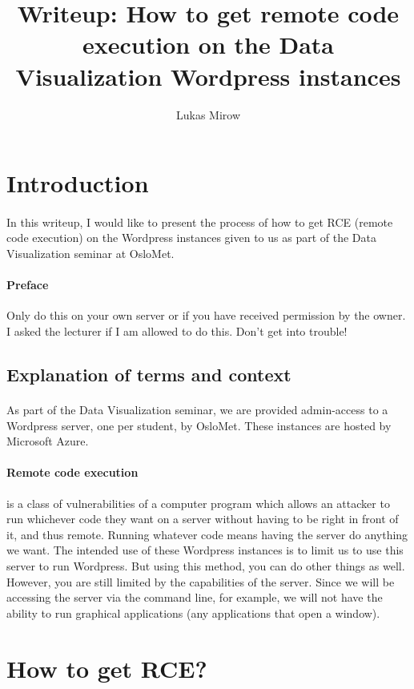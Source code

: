 \documentclass[12pt, a4paper]{article}
\title{Writeup: How to get remote code execution on the Data Visualization Wordpress instances}
\author{Lukas Mirow}
\begin{document}
	\maketitle
	\section{Introduction}
		\paragraph{}
			In this writeup, I would like to present the process of how to get RCE (remote code execution) on the Wordpress instances given to us as part of the Data Visualization seminar at OsloMet.
		\paragraph{Preface}
			Only do this on your own server or if you have received permission by the owner. I asked the lecturer if I am allowed to do this. Don't get into trouble!
		\subsection{Explanation of terms and context}
			\paragraph{}
				As part of the Data Visualization seminar, we are provided admin-access to a Wordpress server, one per student, by OsloMet. These instances are hosted by Microsoft Azure.
			\paragraph{Remote code execution}
				is a class of vulnerabilities of a computer program which allows an attacker to run whichever code they want on a server without having to be right in front of it, and thus remote. Running whatever code means having the server do anything we want. The intended use of these Wordpress instances is to limit us to use this server to run Wordpress. But using this method, you can do other things as well. However, you are still limited by the capabilities of the server. Since we will be accessing the server via the command line, for example, we will not have the ability to run graphical applications (any applications that open a window).
	\section{How to get RCE?}
\end{document}
